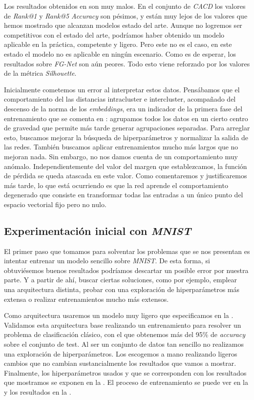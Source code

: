 Los resultados obtenidos en  son muy malos. En el conjunto de \textit{CACD} los valores de \textit{Rank@1} y \textit{Rank@5 Accuracy} son pésimos, y están muy lejos de los valores que hemos mostrado que alcanzan modelos estado del arte. Aunque no logremos ser competitivos con el estado del arte, podríamos haber obtenido un modelo aplicable en la práctica, competente y ligero. Pero este no es el caso, en este estado el modelo no es aplicable en ningún escenario. Como es de esperar, los resultados sobre \textit{FG-Net} son aún peores. Todo esto viene reforzado por los valores de la métrica \textit{Silhouette}.

Inicialmente cometemos un error al interpretar estos datos. Pensábamos que el comportamiento del las distancias intracluster e intercluster, acompañado del descenso de la norma de los \textit{embeddings}, era un indicador de la primera fase del entrenamiento que se comenta en \cite{informatica:principal}: agrupamos todos los datos en un cierto centro de gravedad que permite más tarde generar agrupaciones separadas. Para arreglar esto, buscamos mejorar la búsqueda de hiperparámetros y normalizar la salida de las redes. También buscamos aplicar entrenamientos mucho más largos que no mejoran nada. Sin embargo, no nos damos cuenta de un comportamiento muy anómalo. Independientemente del valor del margen que establezcamos, la función de pérdida se queda atascada en este valor. Como comentaremos y justificaremos más tarde, lo que está ocurriendo es que la red aprende el comportamiento degenerado que consiste en transformar todas las entradas a un único punto del espacio vectorial fijo pero no nulo.

\subsection{Experimentación inicial con \textit{MNIST}} \label{isubsec:experimentos_iniciales_mnist}

El primer paso que tomamos para solventar los problemas que se nos presentan es intentar entrenar un modelo sencillo sobre \textit{MNIST}. De esta forma, si obtuviésemos buenos resultados podríamos descartar un posible error por nuestra parte. Y a partir de ahí, buscar ciertas soluciones, como por ejemplo, emplear una arquitectura distinta, probar con una exploración de hiperparámetros más extensa o realizar entrenamientos mucho más extensos.

Como arquitectura usaremos un modelo muy ligero que especificamos en la . Validamos esta arquitectura base realizando un entrenamiento para resolver un problema de clasificación clásico, con el que obtenemos más del 95\% de \textit{accuracy} sobre el conjunto de test. Al ser un conjunto de datos tan sencillo no realizamos una exploración de hiperparámetros. Los escogemos a mano realizando ligeros cambios que no cambian sustancialmente los resultados que vamos a mostrar. Finalmente, los hiperparámetros usados y que se corresponden con los resultados que mostramos se exponen en la . El proceso de entrenamiento se puede ver en la  y los resultados en la .

